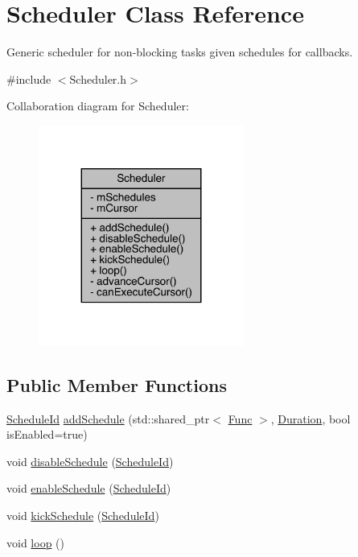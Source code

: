 \hypertarget{class_scheduler}{}\section{Scheduler Class Reference}
\label{class_scheduler}


Generic scheduler for non-\/blocking tasks given schedules for callbacks.  




{\ttfamily \#include $<$Scheduler.\+h$>$}



Collaboration diagram for Scheduler\+:\nopagebreak
\begin{figure}[H]
\begin{center}
\leavevmode
\includegraphics[width=191pt]{class_scheduler__coll__graph}
\end{center}
\end{figure}
\subsection*{Public Member Functions}
\begin{DoxyCompactItemize}
\item 
\mbox{\hyperlink{_scheduler_8h_a1e3b4605bdcbb8f6df7c47013e26e910}{Schedule\+Id}} \mbox{\hyperlink{class_scheduler_a28d9d19644657da9902e52f2901fbc15}{add\+Schedule}} (std\+::shared\+\_\+ptr$<$ \mbox{\hyperlink{_scheduler_8h_a2125a5a2949d6ee13163b671159c0d4d}{Func}} $>$, \mbox{\hyperlink{_scheduler_8h_aca1fa1a7edde6bf9e22c7617400fad31}{Duration}}, bool is\+Enabled=true)
\item 
void \mbox{\hyperlink{class_scheduler_a552dae97cbcd7c621f793311cf151717}{disable\+Schedule}} (\mbox{\hyperlink{_scheduler_8h_a1e3b4605bdcbb8f6df7c47013e26e910}{Schedule\+Id}})
\item 
void \mbox{\hyperlink{class_scheduler_a9df1991d93b673de51cbb4a9d15fe985}{enable\+Schedule}} (\mbox{\hyperlink{_scheduler_8h_a1e3b4605bdcbb8f6df7c47013e26e910}{Schedule\+Id}})
\item 
void \mbox{\hyperlink{class_scheduler_a7d3c44c9a4ca6c35e9970f3c67ac1349}{kick\+Schedule}} (\mbox{\hyperlink{_scheduler_8h_a1e3b4605bdcbb8f6df7c47013e26e910}{Schedule\+Id}})
\item 
void \mbox{\hyperlink{class_scheduler_a81607abe2905dee2e7cf9222a9e35b8f}{loop}} ()
\end{DoxyCompactItemize}
